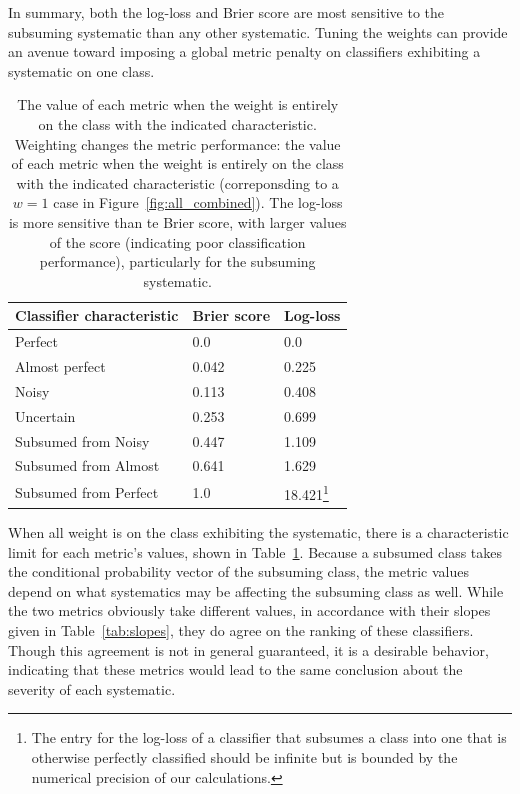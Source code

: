 In summary, both the log-loss and Brier score are most sensitive to the subsuming systematic than any other systematic.
Tuning the weights can provide an avenue toward imposing a global metric penalty on classifiers exhibiting a systematic on one class.

\begin{table}[]
\begin{tabular}{lll}
Classifier characteristic & Brier score & Log-loss\\
\hline
Perfect & 0.0 & 0.0\\
Almost perfect & 0.042 & 0.225\\
Noisy & 0.113 & 0.408\\
Uncertain & 0.253 & 0.699\\
Subsumed from Noisy & 0.447 & 1.109\\
Subsumed from Almost & 0.641 & 1.629\\
Subsumed from Perfect & 1.0 & 18.421\footnote{The entry for the log-loss of a classifier that subsumes a class into one that is otherwise perfectly classified should be infinite but is bounded by the numerical precision of our calculations.}
\end{tabular}
\caption{
The value of each metric when the weight is entirely on the class with the indicated characteristic.
Weighting changes the metric performance: the value of each metric when the weight is entirely on the class with the indicated characteristic (correponsding to a $w=1$ case in Figure~\ref{fig:all_combined}).
The log-loss is more sensitive than te Brier score, with larger values of the score (indicating poor classification performance), particularly for the subsuming systematic.
}
\label{tab:extents}
\end{table}

When all weight is on the class exhibiting the systematic, there is a characteristic limit for each metric's values, shown in Table~\ref{tab:extents}.
Because a subsumed class takes the conditional probability vector of the subsuming class, the metric values depend on what systematics may be affecting the subsuming class as well.
While the two metrics obviously take different values, in accordance with their slopes given in Table~\ref{tab:slopes}, they do agree on the ranking of these classifiers.
Though this agreement is not in general guaranteed, it is a desirable behavior, indicating that these metrics would lead to the same conclusion about the severity of each systematic.

